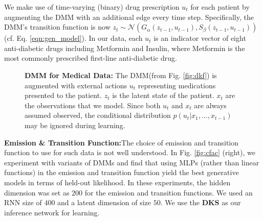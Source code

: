 \documentclass[letterpaper]{article}
\newcommand{\meanfxn}{\textit{G}_{\alpha}}
\newcommand{\covfxn}{\textit{S}_{\beta}}
\theoremstyle{plain}
\newcommand{\DMM}{DMM\xspace}
\newcommand{\DKS}{\textbf{DKS}\xspace}
\begin{document}
{We make use of time-varying (binary) drug prescription $u_t$ for each patient
by augmenting the \DMM with an additional edge every time step. 
Specifically, the \DMM's transition function is now 
$z_t\sim\mathcal{N}(\meanfxn(z_{t-1},u_{t-1}),\covfxn(z_{t-1},u_{t-1}))$ (cf. Eq. \ref{eqn:gen_model}).
In our data, each $u_t$ is an indicator vector of eight anti-diabetic drugs including Metformin and Insulin, where Metformin is the most commonly prescribed first-line anti-diabetic drug. 


\begin{figure}[h]
\centering
    \caption{\small \textbf{\DMM for Medical Data: } 
    The \DMM (from Fig. \ref{fig:dkf}) is augmented with external actions $u_t$ representing medications presented to the patient. $z_t$ is 
the latent state of the patient. $x_t$ are the observations that we model.
Since both $u_t$ and $x_t$ are always assumed observed, the conditional distribution $p(u_t|x_{1},\ldots,x_{t-1})$ 
may be ignored during learning.}
\label{fig:dmm_action}
\end{figure}

\textbf{Emission \& Transition Function:}The choice of emission and transition function to use for 
such data is not well understood. In Fig. \ref{fig:cfac} (right), we experiment with variants of 
DMMs and find that using MLPs (rather than linear functions) in the emission and transition function yield the best generative models in terms of held-out likelihood. 
In these experiments, the hidden dimension was set as $200$ for the emission and transition functions.
We used an RNN size of $400$ and a latent dimension of size $50$. We use the \DKS as our inference network for learning.  

}
\end{document}
